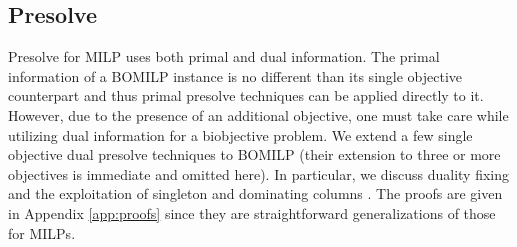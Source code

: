 \documentclass[11.5pt]{article}
\newcommand{\su}[2][1]{\ensuremath{\displaystyle{\sum_{#1}^{#2}}}}
\newcommand{\R}{\mathbb{R}}
\newcommand{\Z}{\mathbb{Z}}
\begin{document}
\subsection{Presolve} \label{sec:presolve}
Presolve for MILP uses both primal and dual information. The primal information of a BOMILP instance is no different than its single objective counterpart and thus primal presolve techniques can be applied directly to it. However, due to the presence of an additional objective, one must take care while utilizing dual information for a biobjective problem. 
We extend a few single objective dual presolve techniques to BOMILP (their extension to three or more  objectives is immediate and omitted here). In particular, we discuss duality fixing \citep{martin2001general} and the exploitation of singleton and dominating columns \citep{gamrath2015}. The proofs are given in Appendix \ref{app:proofs} since they are straightforward generalizations of those for MILPs. %
\end{document}
